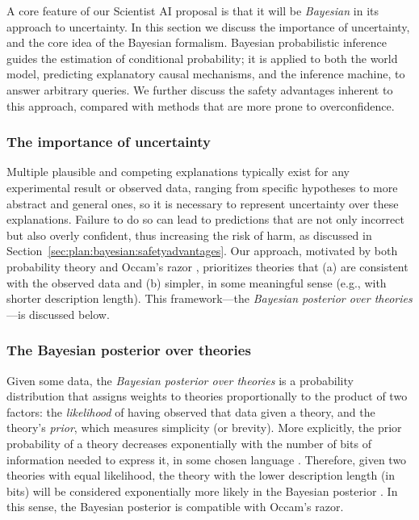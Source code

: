 A core feature of our Scientist AI proposal is that it will be \textit{Bayesian} in its approach to uncertainty. In this section we discuss the importance of uncertainty, and the core idea of the Bayesian formalism. Bayesian probabilistic inference guides the estimation of conditional probability; it is applied to both the world model, predicting explanatory causal mechanisms, and the inference machine, to answer arbitrary queries. We further discuss the safety advantages inherent to this approach, compared with methods that are more prone to overconfidence.


    \subsubsection{The importance of uncertainty}
    \label{sec:plan:bayesian:uncertainty}

Multiple plausible and competing explanations typically exist for any experimental result or observed data, ranging from specific hypotheses to more abstract and general ones, so it is necessary to represent uncertainty over these explanations. Failure to do so can lead to predictions that are not only incorrect but also overly confident, thus increasing the risk of harm, as discussed in Section~\ref{sec:plan:bayesian:safetyadvantages}. Our approach, motivated by both probability theory and Occam’s razor \cite{onlinelibrary.wiley.com.doi.full.10.1111.cogs.12573}, prioritizes theories that (a) are consistent with the observed data and (b) simpler, in some meaningful sense (e.g., with shorter description length). This framework---the \emph{Bayesian posterior over theories}---is discussed below.

    \subsubsection{The Bayesian posterior over theories}
    \label{sec:plan:bayesian:posterior}
    
Given some data, the \textit{Bayesian posterior over theories} is a probability distribution that assigns weights to theories proportionally to the product of two factors: the \textit{likelihood} of having observed that data given a theory, and the theory's \textit{prior}, which measures simplicity (or brevity). More explicitly, the prior probability of a theory decreases exponentially with the number of bits of information needed to express it, in some chosen language \cite{www.sciencedirect.com.science.article.pii.S0019995864902232}. Therefore, given two theories with equal likelihood, the theory with the lower description length (in bits) will be considered exponentially more likely in the Bayesian posterior \cite{www.sciencedirect.com.science.article.pii.S0019995864902232}. In this sense, the Bayesian posterior is compatible with Occam’s razor. 

